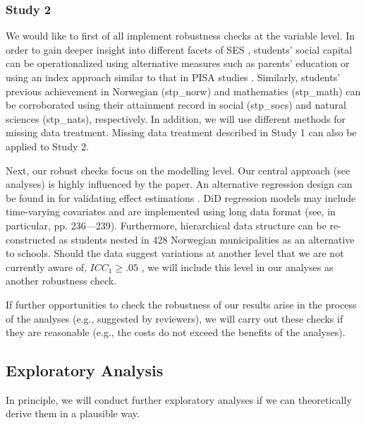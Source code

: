 \subsubsection{Study 2}

We would like to first of all implement robustness checks at the variable level. In order to gain deeper insight into different facets of SES \parencite{apa:2017,avvisati:2020,oconnell:2019}, students' social capital can be operationalized using alternative measures such as parents' education or using an index approach similar to that in PISA studies \parencite{oecd:2019}. Similarly, students' previous achievement in Norwegian (stp\_norw) and mathematics (stp\_math) can be corroborated using their attainment record in social (stp\_socs) and natural sciences (stp\_nats), respectively. In addition, we will use different methods for missing data treatment. Missing data treatment described in Study 1 can also be applied to Study 2.

Next, our robust checks focus on the modelling level. Our central approach (see analyses) is highly influenced by the \textcite{engzell:2021} paper. An alternative regression design can be found in \textcite{angrist:2009} for validating effect estimations \parencite[see also ][]{brumback:2021}.  DiD regression models may include time-varying covariates and are implemented using long data format (see, in particular, pp. 236—239). Furthermore, hierarchical data structure can be re-constructed as students nested in 428 Norwegian municipalities as an alternative to schools. Should the data suggest variations at another level that we are not currently aware of, $ICC_1 \geq .05$ \parencite{lebreton:2008}, we will include this level in our analyses as another robustness check.

If further opportunities to check the robustness of our results arise in the process of the analyses (e.g., suggested by reviewers), we will carry out these checks if they are reasonable (e.g., the costs do not exceed the benefits of the analyses).

\subsection{Exploratory Analysis}

In principle, we will conduct further exploratory analyses if we can theoretically derive them in a plausible way.

